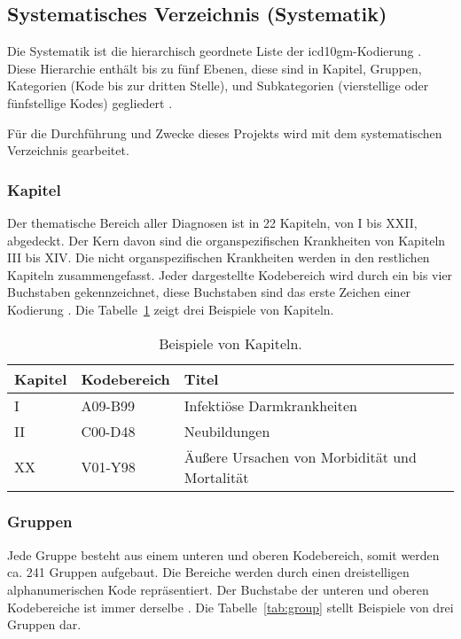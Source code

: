 \subsection{Systematisches Verzeichnis (Systematik)} \label{subsec:sistematic}

Die Systematik ist die hierarchisch geordnete Liste der \ac{icd10gm}-Kodierung \cite{icd10syst}. Diese Hierarchie enthält bis zu fünf Ebenen, diese sind in Kapitel, Gruppen, Kategorien (Kode bis zur dritten Stelle), und Subkategorien (vierstellige oder fünfstellige Kodes) gegliedert \cite{icd10systauf}.

Für die Durchführung und Zwecke dieses Projekts wird mit dem systematischen Verzeichnis gearbeitet.

\subsubsection{Kapitel} \label{subsubsec:chapters}

Der thematische Bereich aller Diagnosen ist in 22 Kapiteln, von I bis XXII, abgedeckt. Der Kern davon sind die organspezifischen Krankheiten von Kapiteln III bis XIV. Die nicht organspezifischen Krankheiten werden in den restlichen Kapiteln zusammengefasst. Jeder dargestellte Kodebereich wird durch ein bis vier Buchstaben gekennzeichnet, diese Buchstaben sind das erste Zeichen einer Kodierung \cite{icd10systauf}. Die Tabelle~\ref{tab:chapter} zeigt drei Beispiele von Kapiteln.

\begin{table}[ht]
	\centering
	\small
	\caption{Beispiele von Kapiteln.}
	\label{tab:chapter}
	\begin{tabular}{|l|l|p{8cm}|}
		\hline
		\rowcolor{lightgray} Kapitel & Kodebereich & Titel \\
		\hline 
		I &  \textsf{A09-B99} & Infektiöse Darmkrankheiten \\ \hline
		II &  \textsf{C00-D48} & Neubildungen \\ \hline
		XX &  \textsf{V01-Y98} & Äußere Ursachen von Morbidität und Mortalität \\ \hline
	\end{tabular}
\end{table}

\subsubsection{Gruppen} \label{subsubsec:groups}

Jede Gruppe besteht aus einem unteren und oberen Kodebereich, somit werden ca. 241 Gruppen aufgebaut. Die Bereiche werden durch einen dreistelligen alphanumerischen Kode repräsentiert. Der Buchstabe der unteren und oberen Kodebereiche ist immer derselbe \cite{icd10systauf}. Die Tabelle~\ref{tab:group} stellt Beispiele von drei Gruppen dar.

